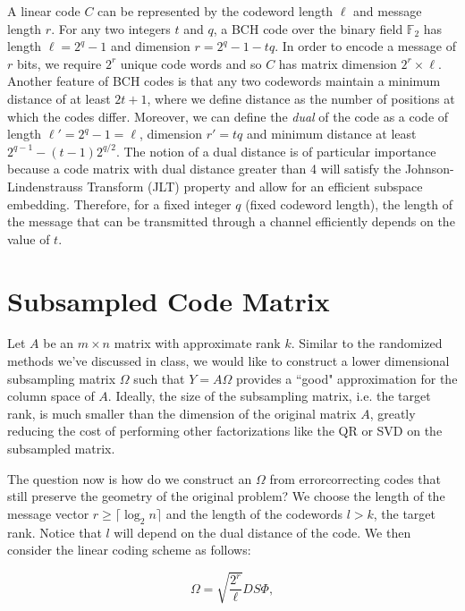 \documentclass[12pt]{article}
\newcommand{\ti}{\textit}
\newcommand{\mB}{\mathbb}
\begin{document}
A linear code $C$ can be represented by the codeword length $\ell$ and message length $r$.  For any two integers $t$ and $q$, a BCH code over the binary field $\mB{F}_2$ has length $\ell = 2^q - 1$ and dimension $r = 2^q - 1 - tq$. In order to encode a message of $r$ bits, we require $2^r$ unique code words and so $C$ has matrix dimension $2^r \times \ell$. Another feature of BCH codes is that any two codewords maintain a minimum distance of at least $2t + 1$, where we define distance as the number of positions at which the codes differ. Moreover, we can define the \ti{dual} of the code as a code of length $\ell' = 2^q - 1 = \ell$, dimension $r' = tq$ and minimum distance at least $2^{q-1} - (t -1)2^{q/2}$. The notion of a dual distance is of particular importance because a code matrix with dual distance greater than 4 will satisfy the Johnson-Lindenstrauss Transform (JLT) property and allow for an efficient subspace embedding. Therefore, for a fixed integer $q$ (fixed codeword length), the length of the message that can be transmitted through a channel efficiently depends on the value of $t$.

\section{Subsampled Code Matrix}
Let $A$ be an $m \times n$ matrix with approximate rank $k$. Similar to the randomized methods we've discussed in class, we would like to construct a lower dimensional subsampling matrix  $\Omega$ such that $Y = A \Omega $ provides a ``good" approximation for the column space of $A$. Ideally, the size of the subsampling matrix, i.e. the target rank, is much smaller than the dimension of the original matrix $A$, greatly reducing the cost of performing other factorizations like the QR or SVD on the subsampled matrix.

\vspace{3mm}
The question now is how do we construct an $\Omega$ from errorcorrecting codes  that still preserve the geometry of the original problem? We choose the length of the message vector $r \ge \lceil{\log_2n\rceil}$ and the length of the codewords $l > k$, the target rank. Notice that $l$ will depend on the dual distance of the code. We then consider the linear coding scheme as follows: 

\[ \Omega = \sqrt{ \frac{ 2^r }{ \ell } } D S \Phi, \] 
\end{document}
